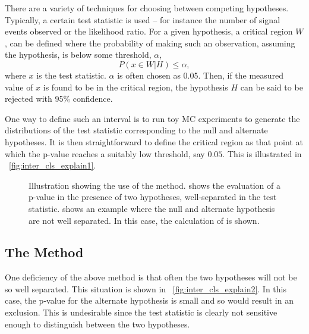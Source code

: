 There are a variety of techniques for choosing between competing
hypotheses. Typically, a certain test statistic is used -- for instance the
number of signal events observed or the likelihood ratio. For a given
hypothesis, a critical region $W$, can be defined where the probability of
making such an observation, assuming the hypothesis, is below some threshold,
$\alpha$,
\begin{equation*}
P\left(x \in W|H\right) \leq \alpha,
\end{equation*}
where $x$ is the test statistic. $\alpha$ is often chosen as 0.05. Then, if the
measured value of $x$ is found to be in the critical region, the hypothesis $H$
can be said to be rejected with 95\% confidence.

One way to define such an interval is to run toy \ac{MC} experiments to
generate the distributions of the test statistic corresponding to the null and
alternate hypotheses. It is then straightforward to define the critical region
as that point at which the p-value reaches a suitably low threshold, say
$0.05$. This is illustrated in \fig~\ref{fig:inter_cls_explain1}.

\begin{figure}
\centering
{}
\caption[Illustration showing the use of the \CLs method]{Illustration showing
  the use of the \CLs method.  shows the
  evaluation of a p-value in the presence of two hypotheses, well-separated in
  the test statistic.  shows an example where the
  null and alternate hypothesis are not well separated. In this case, the
  calculation of \CLs is shown.}
\label{fig:inter_cls_explain}
\end{figure}

\subsection[The \CLs Method]{The \boldmath{\CLs} Method}
One deficiency of the above method is that often the two hypotheses will not be
so well separated. This situation is shown in
\fig~\ref{fig:inter_cls_explain2}. In this case, the p-value for the alternate
hypothesis is small and so would result in an exclusion. This is undesirable
since the test statistic is clearly not sensitive enough to distinguish between
the two hypotheses.

